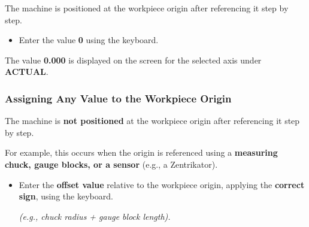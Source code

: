 The machine is positioned at the workpiece origin after referencing it step by step.

\begin{itemize}
    \item Enter the value \textbf{0} using the keyboard.
    \vspace{.6cm}
\end{itemize}

\vspace{.5cm}

The value \textbf{0.000} is displayed on the screen for the selected axis under \textbf{ACTUAL}.

\begin{itemize}
\end{itemize}

\vspace{1cm}

\newpage
\subsubsection*{Assigning Any Value to the Workpiece Origin}

The machine is \textbf{not positioned} at the workpiece origin after referencing it step by step.

For example, this occurs when the origin is referenced using a \textbf{measuring chuck, gauge blocks, or a sensor} (e.g., a Zentrikator).

\begin{itemize}
    \item Enter the \textbf{offset value} relative to the workpiece origin, applying the \textbf{correct sign}, using the keyboard.
    
    \textit{(e.g., chuck radius + gauge block length).}
    \vspace{.6cm}
\end{itemize}

